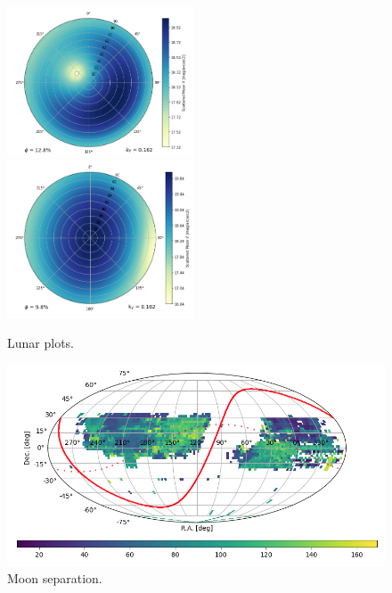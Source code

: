 \begin{figure}[h]
    \centering
    \includegraphics[width=0.495\textwidth]{images/specsim/lunar_plot_zen_21.21_az_307.76_ph_0.13.png}
    \includegraphics[width=0.495\textwidth]{images/specsim/lunar_plot_zen_97.31_az_100.50_ph_0.10.png}
    \caption{Lunar plots.}
    \label{fig:lunar}
\end{figure}

\begin{figure}[h]
\centering
\includegraphics[width=16cm]{images/specsim/moon_separation_binned.png}
\caption{Moon separation.}
\label{fig:moon_sep}
\end{figure}

